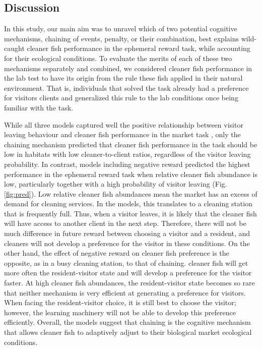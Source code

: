 \documentclass[]{rsos}%
\begin{document}
\hypertarget{discussion}{%
\subsection{Discussion}\label{discussion}}

In this study, our main aim was to unravel which of two potential
cognitive mechanisms, chaining of events, penalty,
or their combination, best explains wild-caught cleaner fish
performance in the ephemeral reward task, while accounting for their
ecological conditions. To evaluate the merits of each of these two mechanisms
separately and combined, we considered cleaner fish performance
in the lab test to have its origin from the rule these fish applied
in their natural environment. That is, individuals that
solved the task already had a preference for
visitors clients and generalized this rule to the lab conditions
once being familiar with the task.

While all three models captured well the positive relationship between visitor
leaving behaviour and cleaner fish performance in
the market task \citep{triki_Biological_2019}, only the chaining mechanism
predicted that cleaner fish performance in the task should be low in
habitats with low cleaner-to-client ratios, regardless of the
visitor leaving probability. In contrast, models including
negative reward predicted the highest performance in the ephemeral
reward task when relative cleaner fish abundance is low, particularly
together with a high probability of visitor leaving (Fig. \ref{fig:pred}).
Low relative cleaner fish abundances mean the market has an excess of demand for
cleaning services. In the models, this translates to a cleaning station
that is frequently full. Thus, when a visitor leaves, it is likely that the
cleaner fish will have access to another client in the next step. Therefore,
there will not be much difference in future reward between choosing
a visitor and a resident, and cleaners will not develop a preference for the
visitor in these conditions. On the other hand, the effect of negative reward
on cleaner fish preference is the opposite, as in a busy cleaning station, to
that of chaining. cleaner fish will get more often the resident-visitor
state and will develop a preference for the visitor faster.
At high cleaner fish abundances, the resident-visitor state
becomes so rare that neither mechanism is very efficient
at generating a preference for visitors. When facing the
resident-visitor choice, it is still best to choose the visitor; however,
the learning machinery will not be able to develop this preference
efficiently. Overall, the models suggest that chaining is the cognitive
mechanism that allows cleaner fish to adaptively adjust to their
biological market ecological conditions.
\end{document}
